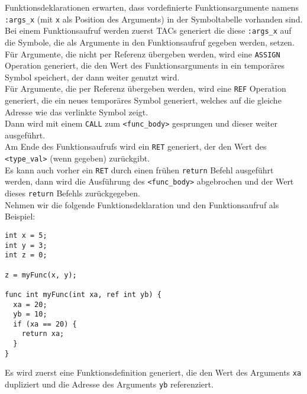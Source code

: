 Funktionsdeklarationen erwarten, dass vordefinierte Funktionsargumente namens \texttt{:args\_x} (mit \texttt{x} als Position des Arguments) in der Symboltabelle vorhanden sind.
Bei einem Funktionsaufruf werden zuerst \acp{TAC} generiert die diese \texttt{:args\_x} auf die Symbole, die als Argumente in den Funktionsaufruf gegeben werden, setzen.
Für Argumente, die nicht per Referenz übergeben werden, wird eine \texttt{ASSIGN} Operation generiert, die den Wert des Funktionsarguments in ein temporäres Symbol speichert, der dann weiter genutzt wird.\\
Für Argumente, die per Referenz übergeben werden, wird eine \texttt{REF} Operation generiert, die ein neues temporäres Symbol generiert, welches auf die gleiche Adresse wie das verlinkte Symbol zeigt.\\
Dann wird mit einem \texttt{CALL} zum \texttt{<func\_body>} gesprungen und dieser weiter ausgeführt.\\
Am Ende des Funktionsaufrufs wird ein \texttt{RET} generiert, der den Wert des \texttt{<type\_val>} (wenn gegeben) zurückgibt.\\
Es kann auch vorher ein \texttt{RET} durch einen frühen \texttt{return} Befehl ausgeführt werden, dann wird die Ausführung des \texttt{<func\_body>} abgebrochen und der Wert dieses \texttt{return} Befehls zurückgegeben.\\

Nehmen wir die folgende Funktionsdeklaration und den Funktionsaufruf als Beispiel:

\begin{lstlisting}[caption={Beispiel Funktionsdeklaration und Funktionsaufruf}]
int x = 5;
int y = 3;
int z = 0;

z = myFunc(x, y);

func int myFunc(int xa, ref int yb) {
  xa = 20;
  yb = 10;
  if (xa == 20) {
    return xa;
  }
}
\end{lstlisting}

Es wird zuerst eine Funktionsdefinition generiert, die den Wert des Arguments \texttt{xa} dupliziert und die Adresse des Arguments \texttt{yb} referenziert.

